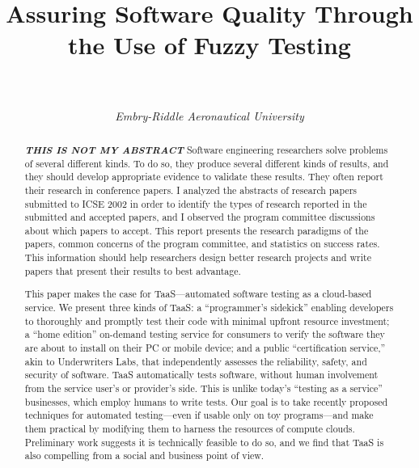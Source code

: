 \documentclass[10pt, final, journal, letterpaper, twoside, twocolumn]{IEEEtran}
\begin{document}
\title{Assuring Software Quality Through the Use of Fuzzy Testing}
\author{ \\
	\\
		\textit{Embry-Riddle Aeronautical University}}

\maketitle


\begin{abstract}
	\textbf{\textit{THIS IS NOT MY ABSTRACT}} Software engineering researchers solve problems of several different kinds. To do so, they produce  several different kinds of results, and they should develop appropriate evidence to validate these results. They often report their research in conference papers. I analyzed the abstracts of research papers submitted to ICSE 2002 in order to identify the types of research reported in the submitted and accepted papers, and I observed the program committee discussions about which papers to accept. This report presents the research paradigms of the papers, common concerns of the program committee, and statistics on success rates. This information should help researchers design better research projects and write papers that present their results to best advantage. 
	
	This paper makes the case for TaaS—automated software testing as a cloud-based service. We present three kinds of TaaS: a “programmer’s sidekick” enabling developers to thoroughly and promptly test their code with minimal upfront resource investment; a “home edition” on-demand testing service for consumers to verify the software they are about to install on their PC or mobile device; and a public “certification service,” akin to Underwriters Labs, that independently assesses the reliability, safety, and security of software.
	TaaS automatically tests software, without human involvement from the service user’s or provider’s side. This is unlike today’s “testing as a service” businesses, which employ humans to write tests. Our goal is to take recently proposed techniques for automated testing—even if usable only on toy programs—and make them practical by modifying them to harness the resources of compute clouds. Preliminary work suggests it is technically feasible to do so, and we find that TaaS is also compelling from a social and business point of view.
\end{abstract}
\end{document}
